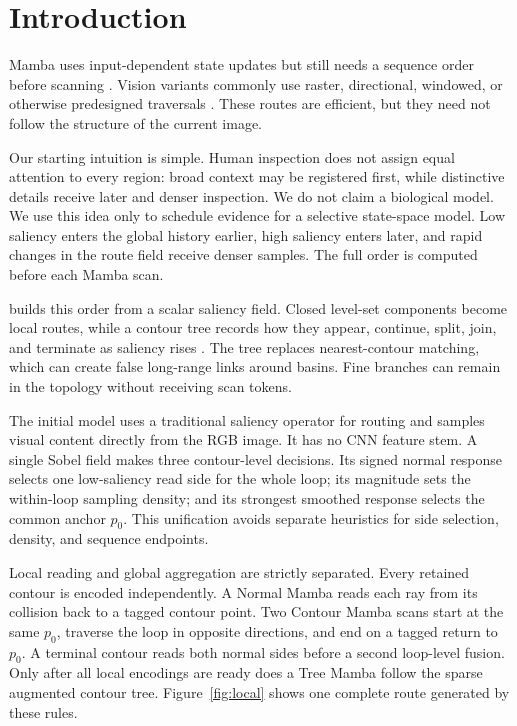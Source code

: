 \section{Introduction}

Mamba uses input-dependent state updates but still needs a sequence order before scanning \cite{gu2023mamba}. Vision variants commonly use raster, directional, windowed, or otherwise predesigned traversals \cite{zhu2024vim,liu2024vmamba,yang2024plainmamba,huang2024localmamba}. These routes are efficient, but they need not follow the structure of the current image.

Our starting intuition is simple. Human inspection does not assign equal attention to every region: broad context may be registered first, while distinctive details receive later and denser inspection. We do not claim a biological model. We use this idea only to schedule evidence for a selective state-space model. Low saliency enters the global history earlier, high saliency enters later, and rapid changes in the route field receive denser samples. The full order is computed before each Mamba scan.

\method{} builds this order from a scalar saliency field. Closed level-set components become local routes, while a contour tree records how they appear, continue, split, join, and terminate as saliency rises \cite{carr2003contourtrees}. The tree replaces nearest-contour matching, which can create false long-range links around basins. Fine branches can remain in the topology without receiving scan tokens.

The initial model uses a traditional saliency operator for routing and samples visual content directly from the RGB image. It has no CNN feature stem. A single Sobel field makes three contour-level decisions. Its signed normal response selects one low-saliency read side for the whole loop; its magnitude sets the within-loop sampling density; and its strongest smoothed response selects the common anchor $p_0$. This unification avoids separate heuristics for side selection, density, and sequence endpoints.

Local reading and global aggregation are strictly separated. Every retained contour is encoded independently. A Normal Mamba reads each ray from its collision back to a tagged contour point. Two Contour Mamba scans start at the same $p_0$, traverse the loop in opposite directions, and end on a tagged return to $p_0$. A terminal contour reads both normal sides before a second loop-level fusion. Only after all local encodings are ready does a Tree Mamba follow the sparse augmented contour tree. Figure~\ref{fig:local} shows one complete route generated by these rules.

